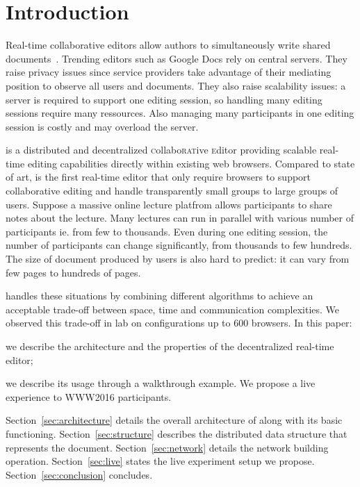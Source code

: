 
\section{Introduction}
\label{sec:introduction}

Real-time collaborative editors allow authors to simultaneously write
shared documents~\cite{greenberg1994real}. Trending editors such as
Google Docs rely on central servers. They raise privacy issues since
service providers take advantage of their mediating position to
observe all users and documents. They also raise scalability issues: a
server is required to support one editing session, so handling many
editing sessions require many ressources. Also managing many
participants in one editing session is costly and may overload the server.

\CRATE is a distributed and decentralized
\textsc{c}ollabo\textsc{rat}ive \textsc{e}ditor providing scalable
real-time editing capabilities directly within existing web
browsers. Compared to state of art, \CRATE is the first real-time
editor that only require browsers to support collaborative editing and
handle transparently small groups to large groups of
users. 
Suppose a massive online lecture platfrom allows participants to share
notes about the lecture. Many lectures can run in parallel with
various number of participants ie. from few to thousands. Even during
one editing session, the number of participants can change
significantly, from thousands to few hundreds. The size of document
produced by users is also hard to predict: it can vary from few pages
to hundreds of pages. 

\CRATE handles these situations by combining different algorithms to
achieve an acceptable trade-off between space, time and communication
complexities. We observed this trade-off \CRATE in lab on configurations up
to 600 browsers. In this paper:
\begin{inparaenum}[(i)]
\item we describe the architecture and the properties of the \CRATE
  decentralized real-time editor;
\item we describe its usage through a walkthrough example. We propose
  a live experience to WWW2016 participants.
\end{inparaenum}

Section~\ref{sec:architecture} details the overall architecture of \CRATE along
with its basic functioning. Section~\ref{sec:structure} describes the
distributed data structure that represents the
document. Section~\ref{sec:network} details the network building
operation. Section~\ref{sec:live} states the live experiment setup we
propose. Section~\ref{sec:conclusion} concludes.


